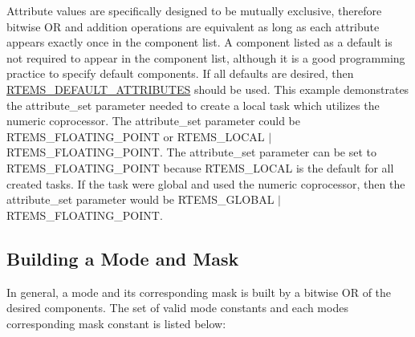 Attribute values are specifically designed to be mutually exclusive, therefore bitwise OR and addition operations are equivalent as long as each attribute appears exactly once in the component list. A component listed as a default is not required to appear in the component list, although it is a good programming practice to specify default components. If all defaults are desired, then \mbox{\hyperlink{group__ClassicAttributes_gae5dc2c331679bb5da53ab70010061252}{R\+T\+E\+M\+S\+\_\+\+D\+E\+F\+A\+U\+L\+T\+\_\+\+A\+T\+T\+R\+I\+B\+U\+T\+ES}} should be used. This example demonstrates the attribute\+\_\+set parameter needed to create a local task which utilizes the numeric coprocessor. The attribute\+\_\+set parameter could be {\ttfamily R\+T\+E\+M\+S\+\_\+\+F\+L\+O\+A\+T\+I\+N\+G\+\_\+\+P\+O\+I\+NT} or {\ttfamily R\+T\+E\+M\+S\+\_\+\+L\+O\+C\+AL} $\vert$ {\ttfamily R\+T\+E\+M\+S\+\_\+\+F\+L\+O\+A\+T\+I\+N\+G\+\_\+\+P\+O\+I\+NT}. The attribute\+\_\+set parameter can be set to {\ttfamily R\+T\+E\+M\+S\+\_\+\+F\+L\+O\+A\+T\+I\+N\+G\+\_\+\+P\+O\+I\+NT} because {\ttfamily R\+T\+E\+M\+S\+\_\+\+L\+O\+C\+AL} is the default for all created tasks. If the task were global and used the numeric coprocessor, then the attribute\+\_\+set parameter would be {\ttfamily R\+T\+E\+M\+S\+\_\+\+G\+L\+O\+B\+AL} $\vert$ {\ttfamily R\+T\+E\+M\+S\+\_\+\+F\+L\+O\+A\+T\+I\+N\+G\+\_\+\+P\+O\+I\+NT}.\hypertarget{group__ClassicTasks_ClassicTasksSecBuildingModeAndMask}{}\subsection{Building a Mode and Mask}\label{group__ClassicTasks_ClassicTasksSecBuildingModeAndMask}
In general, a mode and its corresponding mask is built by a bitwise OR of the desired components. The set of valid mode constants and each mode\textquotesingle{}s corresponding mask constant is listed below\+:

